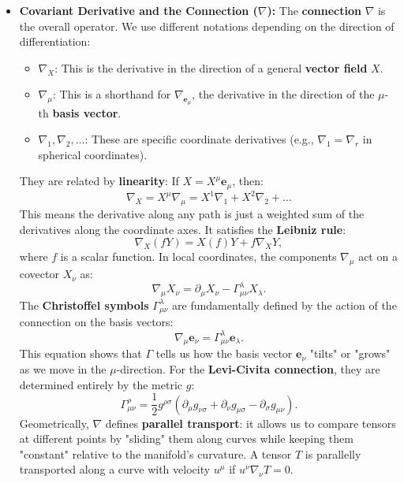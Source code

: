 \begin{solution}
\begin{itemize}
    \item \textbf{Covariant Derivative and the Connection ($\nabla$):}
    The \textbf{connection} $\nabla$ is the overall operator. We use different notations depending on the direction of differentiation:
    \begin{itemize}
        \item \textbf{$\nabla_X$}: This is the derivative in the direction of a general \textbf{vector field} $X$.
        \item \textbf{$\nabla_\mu$}: This is a shorthand for $\nabla_{\mathbf{e}_\mu}$, the derivative in the direction of the $\mu$-th \textbf{basis vector}.
        \item \textbf{$\nabla_1, \nabla_2, \dots$}: These are specific coordinate derivatives (e.g., $\nabla_1 = \nabla_r$ in spherical coordinates).
    \end{itemize}
    They are related by \textbf{linearity}: If $X = X^\mu \mathbf{e}_\mu$, then:
    \[ \nabla_X = X^\mu \nabla_\mu = X^1 \nabla_1 + X^2 \nabla_2 + \dots \]
    This means the derivative along any path is just a weighted sum of the derivatives along the coordinate axes. It satisfies the \textbf{Leibniz rule}:
    \[ \nabla_X (f Y) = X(f) Y + f \nabla_X Y, \]
    where $f$ is a scalar function. In local coordinates, the components $\nabla_\mu$ act on a covector $X_\nu$ as:
    \[ \nabla_\mu X_\nu = \partial_\mu X_\nu - \Gamma^\lambda_{\mu\nu} X_\lambda. \]
    The \textbf{Christoffel symbols} $\Gamma^\lambda_{\mu\nu}$ are fundamentally defined by the action of the connection on the basis vectors:
    \[ \nabla_\mu \mathbf{e}_\nu = \Gamma^\lambda_{\mu\nu} \mathbf{e}_\lambda. \]
    This equation shows that $\Gamma$ tells us how the basis vector $\mathbf{e}_\nu$ "tilts" or "grows" as we move in the $\mu$-direction. For the \textbf{Levi-Civita connection}, they are determined entirely by the metric $g$:
    \[ \Gamma^\rho_{\mu\nu} = \frac{1}{2} g^{\rho\sigma} \left( \partial_\mu g_{\nu\sigma} + \partial_\nu g_{\mu\sigma} - \partial_\sigma g_{\mu\nu} \right). \]
    Geometrically, $\nabla$ defines \textbf{parallel transport}: it allows us to compare tensors at different points by "sliding" them along curves while keeping them "constant" relative to the manifold's curvature. A tensor $T$ is parallelly transported along a curve with velocity $u^\mu$ if $u^\nu \nabla_\nu T = 0$.


\end{itemize}
\end{solution}
